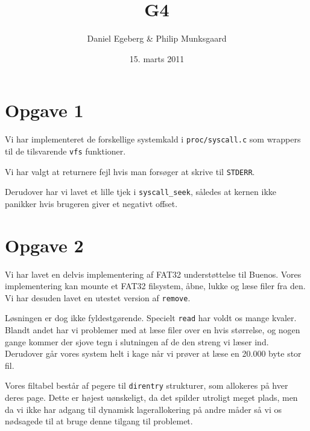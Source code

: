 \documentclass [10pt,a4paper]{article}
\title{G4}
\author{Daniel Egeberg \& Philip Munksgaard}
\date{15. marts 2011}
\begin{document}
\maketitle

\section*{Opgave 1} %

Vi har implementeret de forskellige systemkald i \verb+proc/syscall.c+
som wrappers til de tilsvarende \verb+vfs+ funktioner.

Vi har valgt at returnere fejl hvis man forsøger at skrive til
\verb+STDERR+.

Derudover har vi lavet et lille tjek i \verb+syscall_seek+, således at
kernen ikke panikker hvis brugeren giver et negativt offset.


\section*{Opgave 2} %

Vi har lavet en delvis implementering af FAT32 understøttelse til
Buenos. Vores implementering kan mounte et FAT32 filsystem, åbne,
lukke og læse filer fra den. Vi har desuden lavet en utestet version
af \verb+remove+.

Løsningen er dog ikke fyldestgørende. Specielt \verb+read+ har voldt
os mange kvaler. Blandt andet har vi problemer med at læse filer over
en hvis størrelse, og nogen gange kommer der sjove tegn i slutningen
af de den streng vi læser ind. Derudover går vores system helt i kage
når vi prøver at læse en 20.000 byte stor fil.

Vores filtabel består af pegere til \verb+direntry+ strukturer, som
allokeres på hver deres page. Dette er højest uønskeligt, da det
spilder utroligt meget plads, men da vi ikke har adgang til dynamisk
lagerallokering på andre måder så vi os nødsagede til at bruge denne
tilgang til problemet.

\end{document}
